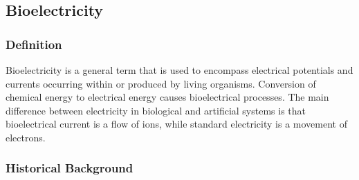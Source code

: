 \documentclass[14pt,a4paper]{scrartcl}
\begin{document}
\subsection{Bioelectricity}
\label{sec:Hypothesis:Bioelectricity}

\subsubsection{Definition}
\label{sec:Hypothesis:Bioelectricity:Definition}

Bioelectricity is a general term that is used to encompass electrical potentials and currents occurring within or produced by living organisms. Conversion of chemical energy to electrical energy causes bioelectrical processes. The main difference between electricity in biological and artificial systems is that bioelectrical current is a flow of ions, while standard electricity is a movement of electrons.

\subsubsection{Historical Background}
\label{sec:Hypothesis:Bioelectricity:Historical Background}
\end{document}
